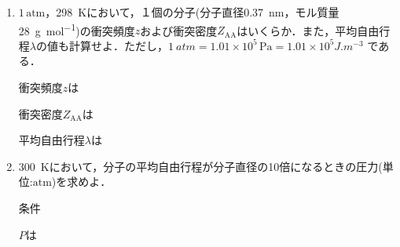 \documentclass[uplatex,dvipdfmx,a4paper,10pt]{jsarticle}
\begin{document}
\begin{enumerate}
\def\labelenumi{\arabic{enumi}.}
\setcounter{enumi}{2}
\item
  \(1\,\mathrm{atm}\)，\SI{298}{\kelvin}において，１個の分子(分子直径\SI{0.37}{nm}，モル質量\SI{28}{g.mol^{-1}})の衝突頻度\(z\)および衝突密度\(Z_\mathrm{AA}\)はいくらか．また，平均自由行程\(\lambda\)の値も計算せよ．ただし，\(\SI{1}{atm} = 1.01 \times 10^5 \,\si{\pascal}= 1.01 \times 10^5 \si{J.m^{-3}}\)
  である．

  衝突頻度\(z\)は

  

  衝突密度\(Z_\mathrm{AA}\)は

  

  平均自由行程\(\lambda\)は

  
\item
  \SI{300}{\kelvin}において，分子の平均自由行程が分子直径の10倍になるときの圧力(単位:\(\mathrm{atm}\))を求めよ．

  条件

  

  \(P\)は

  
\end{enumerate}
\end{document}
